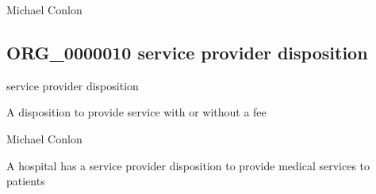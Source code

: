 \documentclass[letterpaper,10pt,english]{sphinxmanual}
\begin{document}
\begin{sphinxShadowBox}

\sphinxAtStartPar
Michael Conlon 
\end{sphinxShadowBox}
\begin{quote}

\ignorespaces \end{quote}


\subsection{ORG\_0000010 \sphinxhyphen{} service provider disposition}
\label{\detokenize{doc-ORG_0000010:org-0000010-service-provider-disposition}}\label{\detokenize{doc-ORG_0000010:index-0}}\label{\detokenize{doc-ORG_0000010::doc}}
\begin{sphinxShadowBox}

\sphinxAtStartPar
service provider disposition
\end{sphinxShadowBox}

\begin{sphinxShadowBox}

\sphinxAtStartPar
{\hyperref[\detokenize{doc-BFO_0000016::doc}]{}}
\end{sphinxShadowBox}

\begin{sphinxShadowBox}

\sphinxAtStartPar
A disposition to provide service with or without a fee
\end{sphinxShadowBox}

\begin{sphinxShadowBox}

\sphinxAtStartPar
Michael Conlon 
\end{sphinxShadowBox}

\begin{sphinxShadowBox}

\sphinxAtStartPar
A hospital has a service provider disposition to provide medical services to patients
\end{sphinxShadowBox}
\end{document}
